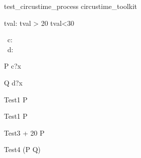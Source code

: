 \begin{zsection}
   \SECTION test\_circustime\_process \parents circustime\_toolkit
\end{zsection}

\begin{axdef}
   tval: \nat
\where
   tval > 20 \land tval<30
\end{axdef}

\begin{circus}
     \circchannel\ c: \nat \\
     \circchannel\ d: \nat \\
\end{circus}

\begin{circus}
    \circprocess P \circdef \circbegin \circspot c?x \then \Skip \circend \\
\end{circus}


\begin{circus}
    \circprocess Q \circdef \circbegin \circspot d?x \then \Skip \circend \\
\end{circus}


\begin{circus}
    \circprocess Test1 \circdef {} \rcirctime \circstartby P \\
\end{circus}


\begin{circus}
   \circprocess Test1 \circdef  {} \rcirctime \circstartby P  \\
\end{circus}


\begin{circus}
   \circprocess Test3 \circdef  {} + 20 \rcirctime \circstartby P  \\
\end{circus}


\begin{circus}
   \circprocess Test4 \circdef  {} \rcirctime \circstartby (P \circseq Q) \\
\end{circus}


